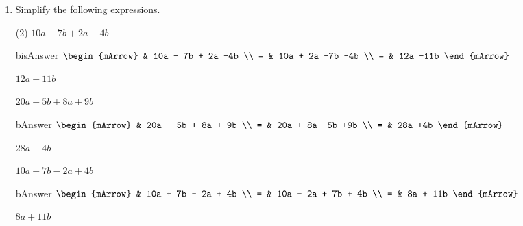 \begin{enumerate}[resume]	
  \item Simplify the following expressions.
  \begin{subtask}(2)
    \task[]  $ 10a - 7b + 2a -4b $
              \begin{envOut}[height=6cm]{bisAnswer}
			       $\begin{mArrow}
			                & 10a - 7b + 2a  -4b      \\ 
                          = & 10a + 2a -7b  -4b     \\ 
                          = & 12a -11b 
	                \end{mArrow}$
              \end{envOut}			  
			  \begin{exercise}\begin{shortsolution}  
				       $12a -11b$
			  \end{shortsolution}\end{exercise}
			  
    \task[]  $ 20a - 5b + 8a  +9b $
              \begin{envOut}[height=6cm]{bAnswer}
			       $\begin{mArrow}
			                & 20a - 5b + 8a  + 9b    \\ 
                          = & 20a + 8a -5b +9b      \\ 
                          = & 28a +4b 
	                \end{mArrow}$
              \end{envOut}			  
			  \begin{exercise}\begin{shortsolution}  
				       $28a +4b$
			  \end{shortsolution}\end{exercise}			  

    \task[]  $ 10a + 7b - 2a + 4b $
              \begin{envOut}[height=6cm]{bAnswer}
			       $\begin{mArrow}
			                & 10a + 7b - 2a + 4b      \\ 
                          = & 10a - 2a + 7b + 4b     \\ 
                          = & 8a + 11b 
	                \end{mArrow}$
              \end{envOut}			  
			  \begin{exercise}\begin{shortsolution}  
				       $8a + 11b$
			  \end{shortsolution}\end{exercise}
			  

\end{subtask}
\end{enumerate}
